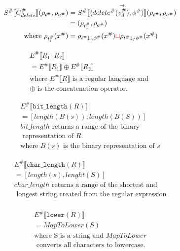 \begin{align*}
    S^\# \llbracket C^\#_{delete} \rrbracket(\rho_{t^\#}, \rho_{a^\#})
    &= S^\# \llbracket \langle delete^\#(\overset{\rightarrow}{v_d^\#}), \phi^\# \rangle \rrbracket (\rho_{t^\#}, \rho_{a^\#}) \\
    &= (\rho_{t^\#_1}, \rho_{a^\#}) \\
    \text{where } \rho_{t^\#_1}(x^\#) &= \rho_{t^\# \downarrow_u \phi^\#}(x^\#) \textcolor{red}{\sqcup} \rho_{t^\# \downarrow_f \phi^\#}(x^\#)
\end{align*}

\begin{align*}
    E^\# \llbracket R_1 \texttt{||} R_2 \rrbracket \\
    = E^\# \llbracket R_1 \rrbracket \oplus  E^\# \llbracket R_2 \rrbracket \\
    \text{where } E^\# \llbracket R \rrbracket \text{ is a regular language and }\\
     \oplus \text{ is the concatenation operator.}
\end{align*}

\begin{align*}
    E^\# \llbracket \texttt{bit\_length} (R) \rrbracket \\
    =  [length(B(s)), length(B(S))] \\
    bit\_length \text{ returns a range of the binary} \\
    \text{ representation of } R. \\
    \text{where } B(s) \text{ is the binary representation of }s
\end{align*}

\begin{align*}
    E^\# \llbracket \texttt{char\_length} (R) \rrbracket \\
    =  [length(s), lenght(S)] \\
    char\_length \text{ returns a range of the shortest and} \\
    \text{ longest string created from the regular expression} \\
\end{align*}

\begin{align*}
    E^\# \llbracket \texttt{lower} (R) \rrbracket \\
    =  MapToLower (S) \\
    \text{where S is a string and } MapToLower \\
    \text{ converts all characters to lowercase.}
\end{align*}

